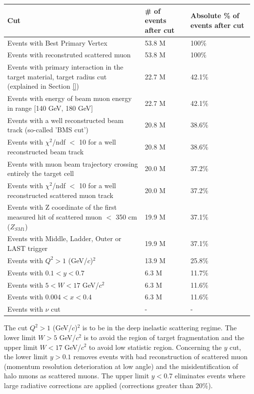 \begin{table}[!h]
  \centering
  \begin{tabular}{p{10cm} p{2cm} p{2cm}}
    \hline
    \hline
     Cut & \# of events after cut & Absolute \% of events after cut  \\
    \hline
    \hline
    Events with Best Primary Vertex & 53.8 M & 100\% \\
    Events with reconstruted scattered muon & 53.8 M & 100\% \\
    Events with primary interaction in the target material, target radius cut (explained in Section \ref{}) & 22.7 M & 42.1\% \\
    Events with energy of beam muon energy in range [140 GeV, 180 GeV] & 22.7 M & 42.1\% \\
    Events with a well reconstructed beam track (so-called 'BMS cut') & 20.8 M & 38.6\% \\
    Events with $\chi^2$/ndf $<$ 10 for a well reconstructed beam track & 20.8 M & 38.6\% \\
    Events with muon beam trajectory crossing entirely the target cell & 20.0 M & 37.2\% \\
    Events with $\chi^2$/ndf $<$ 10 for a well reconstructed scattered muon track & 20.0 M & 37.2\% \\
    Events with Z coordinate of the first measured hit of scattered muon $<$ 350 cm ($Z_{SM1}$) & 19.9 M & 37.1\% \\
    Events with Middle, Ladder, Outer or LAST trigger & 19.9 M & 37.1\% \\
    Events with $Q^2>1$ (GeV/$c$)$^2$ & 13.9 M & 25.8\% \\
    Events with $0.1 < y < 0.7$ & 6.3 M & 11.7\% \\
    Events with $5 < W < 17$ GeV/$c^2$ & 6.3 M & 11.6\% \\
    Events with $0.004 < x < 0.4$ & 6.3 M & 11.6\% \\
    Events with $\nu$ cut & - & - \\
    \hline
    \hline
  \end{tabular}
\end{table}

The cut $Q^2>1$ (GeV/$c$)$^2$ is to be in the deep inelastic scattering regime. The lower limit $W > 5$ GeV/$c^2$ is to avoid the region of target fragmentation and the upper limit $W < 17$ GeV/$c^2$ to avoid low statistic region. Concerning the $y$ cut, the lower limit $y > 0.1$ removes events with bad reconstruction of scattered muon (momentum resolution deterioration at low angle) and the misidentification of halo muons as scattered muons. The upper limit $y < 0.7$ eliminates events where large radiative corrections are applied (corrections greater than 20\%).

